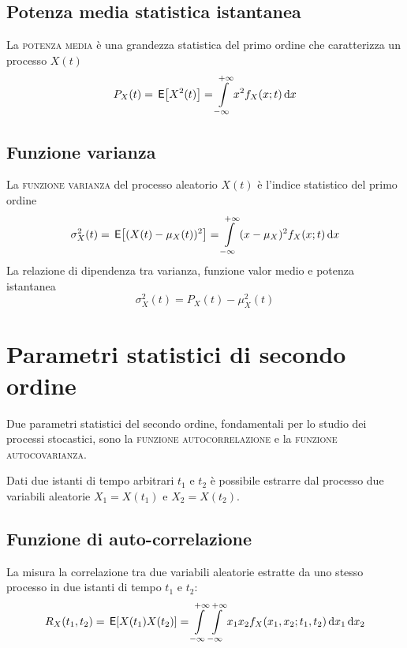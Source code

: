 \subsection{Potenza media statistica istantanea}
La \textsc{potenza media} è una grandezza statistica del primo ordine che caratterizza un processo $X(t)$
\begin{equation}
P_X(t)=\,{\operatorname{\mathsf{E}}}\!\left[{X^2(t)}\right]=\int\limits_{-\infty}^{+\infty}{x^2 f_X(x;t)}{\,\mathop{}\!\mathrm{d}{x}}
\end{equation}

\subsection{Funzione varianza}
La \textsc{funzione varianza} del processo aleatorio $X(t)$ è l'indice statistico del primo ordine
\begin{equation}
\sigma^2_X(t)=\,{\operatorname{\mathsf{E}}}\!\left[{(X(t)-\mu_X(t))^2}\right]=\int\limits_{-\infty}^{+\infty}{(x-\mu_X)^2 f_X(x;t)}{\,\mathop{}\!\mathrm{d}{x}}
\end{equation}
La relazione di dipendenza tra varianza, funzione valor medio e potenza istantanea
\begin{equation}
\sigma^2_X(t)=P_X(t)-\mu^2_X(t)
\end{equation}

\section{Parametri statistici di secondo ordine}
Due parametri statistici del secondo ordine, fondamentali per lo studio dei processi stocastici, sono la \textsc{funzione autocorrelazione} e la \textsc{funzione autocovarianza}.

Dati due istanti di tempo arbitrari $t_1$ e $t_2$ è possibile estrarre dal processo due variabili aleatorie $X_1=X(t_1)$ e $X_2=X(t_2)$.

\subsection{Funzione di auto-correlazione}
La  misura la correlazione tra due variabili aleatorie estratte da uno stesso processo in due istanti di tempo $t_1$ e $t_2$:
\begin{equation}\label{eq:proc_autocorrelazione}
R_X(t_1,t_2)=\,{\operatorname{\mathsf{E}}}\!\left[{X(t_1)X(t_2)}\right]=\int\limits_{-\infty}^{+\infty}{\int\limits_{-\infty}^{+\infty}{x_1 x_2 f_X(x_1,x_2;t_1,t_2)}{\,\mathop{}\!\mathrm{d}{x_1}}}{\,\mathop{}\!\mathrm{d}{x_2}}
\end{equation}


